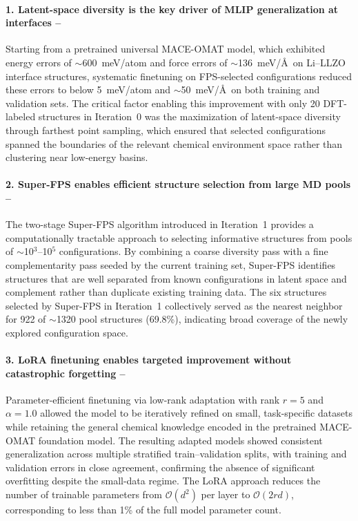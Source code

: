 \documentclass[12pt,a4paper,oneside]{book}
\begin{document}
\paragraph{1. Latent-space diversity is the key driver of MLIP generalization at interfaces --}
Starting from a pretrained universal MACE-OMAT model, which exhibited energy errors
of $\sim$600~meV/atom and force errors of $\sim$136~meV/\AA\ on Li--LLZO interface
structures, systematic finetuning on FPS-selected configurations reduced these errors
to below 5~meV/atom and $\sim$50~meV/\AA\ on both training and validation sets. The
critical factor enabling this improvement with only 20 DFT-labeled structures in
Iteration~0 was the maximization of latent-space diversity through farthest point
sampling, which ensured that selected configurations spanned the boundaries of the
relevant chemical environment space rather than clustering near low-energy basins.

\paragraph{2. Super-FPS enables efficient structure selection from large MD pools --}
The two-stage Super-FPS algorithm introduced in Iteration~1 provides a computationally
tractable approach to selecting informative structures from pools of
$\sim$10$^3$--10$^5$ configurations. By combining a coarse diversity pass with a
fine complementarity pass seeded by the current training set, Super-FPS identifies
structures that are well separated from known configurations in latent space and
complement rather than duplicate existing training data. The six structures selected
by Super-FPS in Iteration~1 collectively served as the nearest neighbor for 922 of
$\sim$1320 pool structures (69.8\%), indicating broad coverage of the newly explored
configuration space.
\paragraph{3. LoRA finetuning enables targeted improvement without catastrophic forgetting --}
Parameter-efficient finetuning via low-rank adaptation with rank $r = 5$ and $\alpha
= 1.0$ allowed the model to be iteratively refined on small, task-specific datasets
while retaining the general chemical knowledge encoded in the pretrained MACE-OMAT
foundation model. The resulting adapted models showed consistent generalization across
multiple stratified train--validation splits, with training and validation errors in
close agreement, confirming the absence of significant overfitting despite the
small-data regime. The LoRA approach reduces the number of trainable parameters from
$\mathcal{O}(d^2)$ per layer to $\mathcal{O}(2rd)$, corresponding to less than 1\%
of the full model parameter count.
\end{document}
